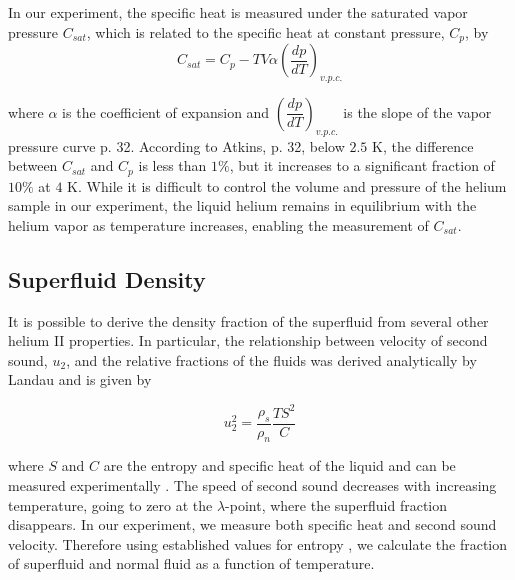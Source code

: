 In our experiment, the specific heat is measured under the saturated
vapor pressure $C_{sat}$, which is related to the specific heat at
constant pressure, $C_p$, by
\begin{equation}\label{formula:cuspecificheat}
C_{sat} = C_p - TV\alpha\left(\dfrac{dp}{dT}\right)_{v.p.c.} 
\end{equation}

where $\alpha$ is the coefficient of expansion and
$\left(\dfrac{dp}{dT}\right)_{v.p.c.}$ is the slope of the vapor
pressure curve \cite{atkins} p. 32. According to Atkins, p. 32, below
$2.5$ K, the difference between $C_{sat}$ and $C_p$ is less than
$1\%$, but it increases to a significant fraction of $10\%$ at $4$
K. While it is difficult to control the volume and pressure of the
helium sample in our experiment, the liquid helium remains in
equilibrium with the helium vapor as temperature increases, enabling the measurement of $C_{sat}$.

\subsection{Superfluid Density}

It is possible to derive the density fraction of the superfluid from
several other helium II properties. In particular, the relationship
between velocity of second sound, $u_2$, and the relative fractions of
the fluids was derived analytically by Landau and is given by

\begin{equation}
u_2^2 = \frac{\rho_s}{\rho_n}\frac{T S^2}{C}
\label{soundspeed}
\end{equation}

where $S$ and $C$ are the entropy and specific heat of the
liquid and can be measured experimentally \cite{atkins}. The speed of
second sound decreases with increasing temperature, going to zero at
the $\lambda$-point, where the superfluid fraction disappears. In our
experiment, we measure both specific heat and second sound velocity.
Therefore using established values for entropy \cite{andro}, we calculate
the fraction of superfluid and normal fluid as a function of
temperature.
